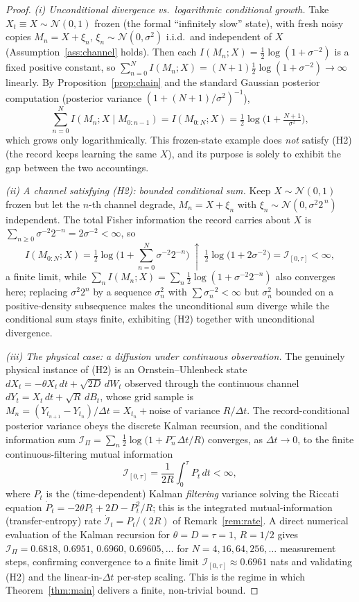 \documentclass{amsart}
\theoremstyle{definition}
\theoremstyle{remark}
\begin{document}
\begin{proof}
\emph{(i) Unconditional divergence vs.\ logarithmic conditional growth.}
Take $X_t\equiv X\sim\mathcal N(0,1)$ frozen (the formal ``infinitely
slow'' state), with fresh noisy copies $M_n=X+\xi_n$,
$\xi_n\sim\mathcal N(0,\sigma^2)$ i.i.d.\ and independent of $X$
(Assumption~\ref{ass:channel} holds). Then each
$I(M_n;X)=\tfrac12\log(1+\sigma^{-2})$ is a fixed positive constant, so
$\sum_{n=0}^N I(M_n;X)=(N+1)\tfrac12\log(1+\sigma^{-2})\to\infty$
linearly. By Proposition~\ref{prop:chain} and the standard Gaussian
posterior computation (posterior variance
$(1+(N+1)/\sigma^2)^{-1}$),
\[
\sum_{n=0}^N I(M_n;X\mid M_{0:n-1})=I(M_{0:N};X)
=\tfrac12\log\!\Big(1+\tfrac{N+1}{\sigma^2}\Big),
\]
which grows only logarithmically. This frozen-state example does
\emph{not} satisfy (H2) (the record keeps learning the same $X$), and
its purpose is solely to exhibit the gap between the two accountings.

\emph{(ii) A channel satisfying (H2): bounded conditional sum.}
Keep $X\sim\mathcal N(0,1)$ frozen but let the $n$-th channel degrade,
$M_n=X+\xi_n$ with $\xi_n\sim\mathcal N(0,\sigma^2 2^{\,n})$
independent. The total Fisher information the record carries about $X$ is
$\sum_{n\ge0}\sigma^{-2}2^{-n}=2\sigma^{-2}<\infty$, so
\[
I(M_{0:N};X)=\tfrac12\log\!\Big(1+\textstyle\sum_{n=0}^N
\sigma^{-2}2^{-n}\Big)\ \uparrow\
\tfrac12\log\!\big(1+2\sigma^{-2}\big)=\mathcal I_{[0,\tau]}<\infty,
\]
a finite limit, while $\sum_n I(M_n;X)=\sum_n\tfrac12\log(1+\sigma^{-2}
2^{-n})$ also converges here; replacing $\sigma^2 2^n$ by a sequence
$\sigma_n^2$ with $\sum\sigma_n^{-2}<\infty$ but $\sigma_n^2$ bounded on
a positive-density subsequence makes the unconditional sum diverge while
the conditional sum stays finite, exhibiting (H2) together with
unconditional divergence.

\emph{(iii) The physical case: a diffusion under continuous
observation.} The genuinely physical instance of (H2) is an
Ornstein--Uhlenbeck state $dX_t=-\theta X_t\,dt+\sqrt{2D}\,dW_t$ observed
through the continuous channel $dY_t=X_t\,dt+\sqrt R\,dB_t$, whose grid
sample is $M_n=(Y_{t_{n+1}}-Y_{t_n})/\Delta t=X_{t_n}+\text{noise of
variance }R/\Delta t$. The record-conditional posterior variance obeys
the discrete Kalman recursion, and the conditional information sum
$\mathcal I_\Pi=\sum_n\tfrac12\log\!\big(1+P_n^-\Delta t/R\big)$
converges, as $\Delta t\to0$, to the finite continuous-filtering mutual
information
\[
\mathcal I_{[0,\tau]}
=\frac{1}{2R}\int_0^\tau P_t\,dt<\infty,
\]
where $P_t$ is the (time-dependent) Kalman \emph{filtering} variance
solving the Riccati equation
$\dot P_t=-2\theta P_t+2D-P_t^2/R$; this is the integrated
mutual-information (transfer-entropy) rate
$\dot{\mathcal I}_t=P_t/(2R)$ of Remark~\ref{rem:rate}. A direct
numerical evaluation of the Kalman recursion for $\theta=D=\tau=1$,
$R=1/2$ gives $\mathcal I_\Pi=0.6818,\,0.6951,\,0.6960,\,0.69605,\dots$
for $N=4,16,64,256,\dots$ measurement steps, confirming convergence to a
finite limit $\mathcal I_{[0,\tau]}\approx0.6961$ nats and validating
(H2) and the linear-in-$\Delta t$ per-step scaling. This is the regime
in which Theorem~\ref{thm:main} delivers a finite, non-trivial bound.
\end{proof}
\end{document}
